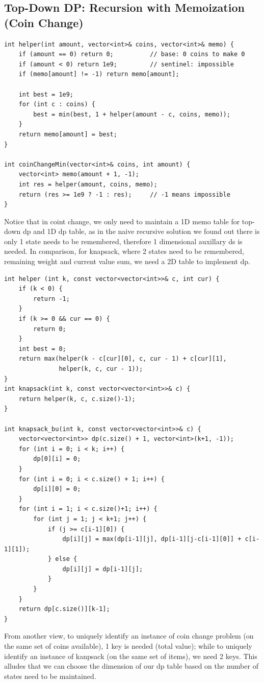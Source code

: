 \documentclass[9pt]{extarticle}
\begin{document}
\subsection{Top-Down DP: Recursion with Memoization (Coin Change)}
\begin{lstlisting}
int helper(int amount, vector<int>& coins, vector<int>& memo) {
    if (amount == 0) return 0;          // base: 0 coins to make 0
    if (amount < 0) return 1e9;         // sentinel: impossible
    if (memo[amount] != -1) return memo[amount];

    int best = 1e9;
    for (int c : coins) {
        best = min(best, 1 + helper(amount - c, coins, memo));
    }
    return memo[amount] = best;
}

int coinChangeMin(vector<int>& coins, int amount) {
    vector<int> memo(amount + 1, -1);
    int res = helper(amount, coins, memo);
    return (res >= 1e9 ? -1 : res);     // -1 means impossible
}
\end{lstlisting}
Notice that in coint change, we only need to maintain a 1D memo table for top-down dp and 1D dp table, 
as in the naive recursive solution we found out there is only 1 state needs to be remembered, therefore
1 dimensional auxillary ds is needed. In comparison, for knapsack, where 2 states need to be remembered, 
remaining weight and current value sum, we need a 2D table to implement dp.
\begin{lstlisting}
int helper (int k, const vector<vector<int>>& c, int cur) {
    if (k < 0) {
        return -1;
    }
    if (k >= 0 && cur == 0) {
        return 0;
    }
    int best = 0;
    return max(helper(k - c[cur][0], c, cur - 1) + c[cur][1], 
               helper(k, c, cur - 1));
}
int knapsack(int k, const vector<vector<int>>& c) {
    return helper(k, c, c.size()-1);
}

int knapsack_bu(int k, const vector<vector<int>>& c) {
    vector<vector<int>> dp(c.size() + 1, vector<int>(k+1, -1));
    for (int i = 0; i < k; i++) {
        dp[0][i] = 0;
    }
    for (int i = 0; i < c.size() + 1; i++) {
        dp[i][0] = 0;
    }
    for (int i = 1; i < c.size()+1; i++) {
        for (int j = 1; j < k+1; j++) {
            if (j >= c[i-1][0]) {
                dp[i][j] = max(dp[i-1][j], dp[i-1][j-c[i-1][0]] + c[i-1][1]);
            } else {
                dp[i][j] = dp[i-1][j];
            }
        }
    }
    return dp[c.size()][k-1];
}
\end{lstlisting}

From another view, to uniquely identify an 
instance of coin change problem (on the same set of coins available), 1 key is needed (total value); while to uniquely identify
an instance of kanpsack (on the same set of items), we need 2 keys. This alludes that we can choose the dimension of our dp table 
based on the number of states need to be maintained. 
\end{document}
